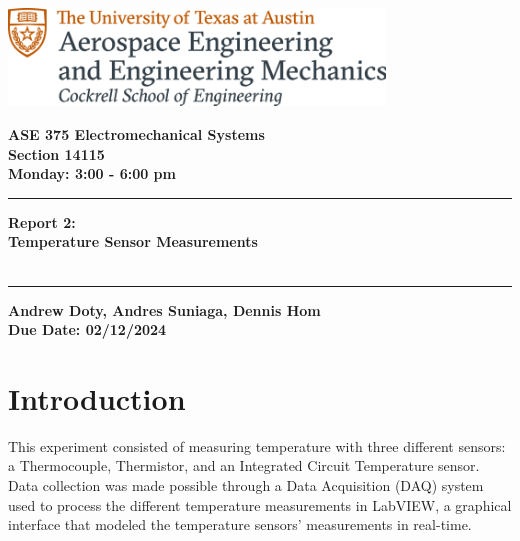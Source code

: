 \documentclass{article}
\begin{document}
\begin{titlepage}
  \centering
  \includegraphics[width=10cm]{ase-logo-formal.png}  %
  \vspace{1cm}  %
 
  \Large \textbf{ASE 375 Electromechanical Systems}\\
  \large \textbf{Section 14115}\\
  \vspace{0.5cm}
  \textbf{Monday: 3:00 - 6:00 pm}\\
 
  \vspace{1cm}
 
  \hrule
  \vspace{0.5cm}
 
  \Huge \textbf{Report 2:\\
  Temperature Sensor Measurements}\\
  \Huge \textbf{}\\
 
  \vspace{0.5cm}
  \hrule
 
  \vspace{1cm}
 
  \normalsize \textbf{Andrew Doty, Andres Suniaga, Dennis Hom}\\
  \normalsize \textbf{Due Date: 02/12/2024}
 
\end{titlepage}
\newpage

\tableofcontents
\thispagestyle{empty}
\newpage



\section{Introduction}
This experiment consisted of measuring temperature with three different sensors: a Thermocouple, Thermistor, and an Integrated Circuit Temperature sensor. Data collection was made possible through a Data Acquisition (DAQ) system used to process the different temperature measurements in LabVIEW, a graphical interface that modeled the temperature sensors' measurements in real-time. 
\end{document}

